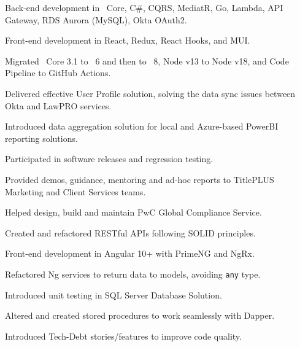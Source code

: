 \documentclass[letterpaper]{cv_12} %
\begin{document}
\begin{newpage}
\begin{minipage}[t]{0.59\textwidth}
    \vspace{\topsep}
    \begin{tightitemize}
        \item Back-end development in \dotnet\ Core, C\#, CQRS,
        MediatR, Go, Lambda, API Gateway, RDS Aurora (MySQL), Okta OAuth2.
        \item Front-end development in React, Redux, React Hooks, and
        MUI.\@
        \item Migrated \dotnet\ Core 3.1 to \dotnet\ 6 and then to \dotnet\ 8, 
        Node v13 to Node v18, and Code Pipeline to GitHub Actions.
        \item Delivered effective User Profile solution, solving the
        data sync issues between Okta and LawPRO services.
        \item Introduced data aggregation solution for local and
        Azure-based PowerBI reporting solutions.
        \item Participated in software releases and regression testing.
        \item Provided demos, guidance, mentoring and ad-hoc reports to 
        TitlePLUS Marketing and Client Services teams.
    \end{tightitemize}

    \sectionspace%


    \begin{tightitemize}
        \item Helped design, build and maintain PwC Global Compliance Service.
        \item Created and refactored RESTful APIs following SOLID
        principles.
        \item Front-end development in Angular 10+ with PrimeNG and
        NgRx.
        \item Refactored Ng services to return data to models, avoiding
        \verb|any| type.
        \item Introduced unit testing in SQL Server Database Solution.
        \item Altered and created stored procedures to work seamlessly
        with Dapper.
        \item Introduced Tech-Debt stories/features to improve code
        quality.
    \end{tightitemize}


\end{minipage}
\end{newpage}
\end{document}
